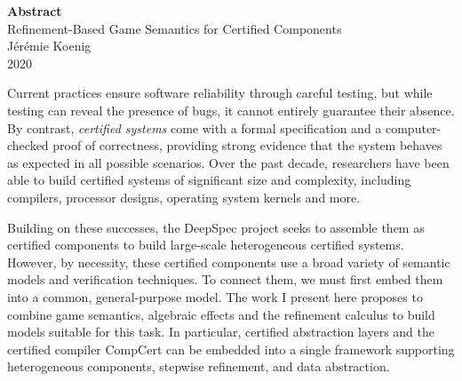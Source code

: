 \documentclass[11pt,oneside]{book}
\theoremstyle{definition}
\newcommand{\gcat}{\mathcal{G}_{\sqsubseteq}}
\begin{document}
\frontmatter

\thispagestyle{empty}
\rule{0pt}{5em}

\begin{center}
  \textbf{Abstract}
  \\
  Refinement-Based Game Semantics for Certified Components
  \\
  J\'er\'emie Koenig
  \\
  2020
\end{center}

\doublespacing

Current practices ensure software reliability through careful testing,
but while testing can reveal the presence of bugs,
it cannot entirely guarantee their absence.
By contrast,
\emph{certified systems} come with a formal specification and
a computer-checked proof of correctness,
providing strong evidence that
the system behaves as expected in all possible scenarios.
Over the past decade,
researchers have been able to build certified systems
of significant size and complexity,
including compilers, processor designs, operating system kernels and more.

Building on these successes,
the DeepSpec project seeks to assemble them as certified components
to build large-scale heterogeneous certified systems.
%
However, by necessity,
these certified components use a broad variety of
semantic models and verification techniques.
To connect them,
we must first embed them into a common, general-purpose model.
The work I present here
proposes to combine
game semantics,
algebraic effects and
the refinement calculus
to build models suitable for this task.
In particular,
certified abstraction layers
and the certified compiler CompCert
can be embedded
into a single framework supporting
heterogeneous components,
stepwise refinement, and
data abstraction.

\singlespacing


\end{document}
